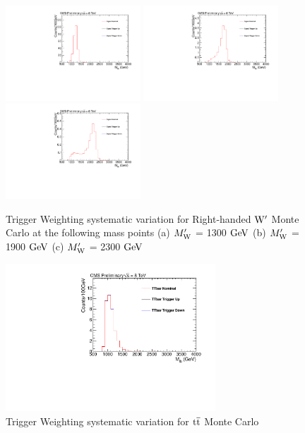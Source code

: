 \begin{figure}[htcb]
\begin{center}
\includegraphics[width=0.45\textwidth]{AN-13-004/figs/Signal_M1300_TriggerWeighting}
\includegraphics[width=0.45\textwidth]{AN-13-004/figs/Signal_M1900_TriggerWeighting}
\includegraphics[width=0.45\textwidth]{AN-13-004/figs/Signal_M2300_TriggerWeighting}
\caption{
Trigger Weighting systematic variation for Right-handed $\mathrm{W}^\prime$ Monte Carlo at the following mass points
(a) $M_\mathrm{W}^\prime$ = 1300$~\mathrm{GeV}$ 
(b) $M_\mathrm{W}^\prime$ = 1900$~\mathrm{GeV}$
(c) $M_\mathrm{W}^\prime$ = 2300$~\mathrm{GeV}$ 
}
\label{figs:signaltrig}
\end{center}
\end{figure}

\begin{figure}[htcb]
\begin{center}
\includegraphics[width=0.7\textwidth]{AN-13-004/figs/TTbar_TriggerWeighting}
\caption{Trigger Weighting systematic variation for $\mathrm{t\overline{t}}$ Monte Carlo}
\label{figs:ttbartrig}
\end{center}
\end{figure}


